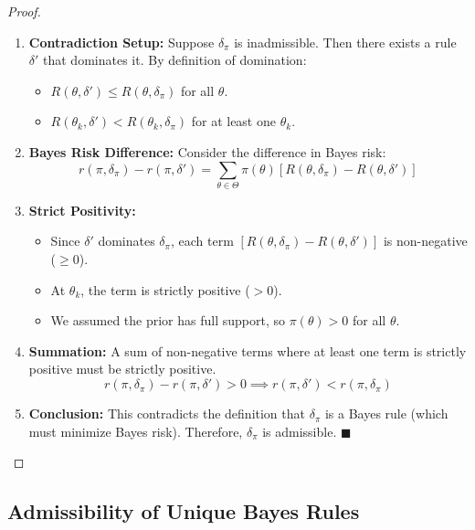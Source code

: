 \documentclass[
  letterpaper,
  DIV=11,
  numbers=noendperiod]{scrreprt}
\providecommand{\tightlist}{%
  \setlength{\itemsep}{0pt}\setlength{\parskip}{0pt}}
\renewcommand{\[}{\begin{equation}}
\renewcommand{\]}{\end{equation}}
\theoremstyle{definition}
\theoremstyle{plain}
\theoremstyle{plain}
\theoremstyle{plain}
\theoremstyle{definition}
\theoremstyle{plain}
\theoremstyle{remark}
\begin{document}
\begin{proof}
\leavevmode

\begin{enumerate}
\def\labelenumi{\arabic{enumi}.}
\item
  \textbf{Contradiction Setup:} Suppose \(\delta_\pi\) is inadmissible.
  Then there exists a rule \(\delta'\) that dominates it. By definition
  of domination:

  \begin{itemize}
  \tightlist
  \item
    \(R(\theta, \delta') \le R(\theta, \delta_\pi)\) for all \(\theta\).
  \item
    \(R(\theta_k, \delta') < R(\theta_k, \delta_\pi)\) for at least one
    \(\theta_k\).
  \end{itemize}
\item
  \textbf{Bayes Risk Difference:} Consider the difference in Bayes risk:
  \[r(\pi, \delta_\pi) - r(\pi, \delta') = \sum_{\theta \in \Theta} \pi(\theta) [R(\theta, \delta_\pi) - R(\theta, \delta')]\]
\item
  \textbf{Strict Positivity:}

  \begin{itemize}
  \tightlist
  \item
    Since \(\delta'\) dominates \(\delta_\pi\), each term
    \([R(\theta, \delta_\pi) - R(\theta, \delta')]\) is non-negative
    (\(\ge 0\)).
  \item
    At \(\theta_k\), the term is strictly positive (\(> 0\)).
  \item
    We assumed the prior has full support, so \(\pi(\theta) > 0\) for
    all \(\theta\).
  \end{itemize}
\item
  \textbf{Summation:} A sum of non-negative terms where at least one
  term is strictly positive must be strictly positive.
  \[r(\pi, \delta_\pi) - r(\pi, \delta') > 0 \implies r(\pi, \delta') < r(\pi, \delta_\pi)\]
\item
  \textbf{Conclusion:} This contradicts the definition that
  \(\delta_\pi\) is a Bayes rule (which must minimize Bayes risk).
  Therefore, \(\delta_\pi\) is admissible. \(\blacksquare\)
\end{enumerate}

\end{proof}

\subsection{Admissibility of Unique Bayes
Rules}\label{admissibility-of-unique-bayes-rules}
\end{document}
